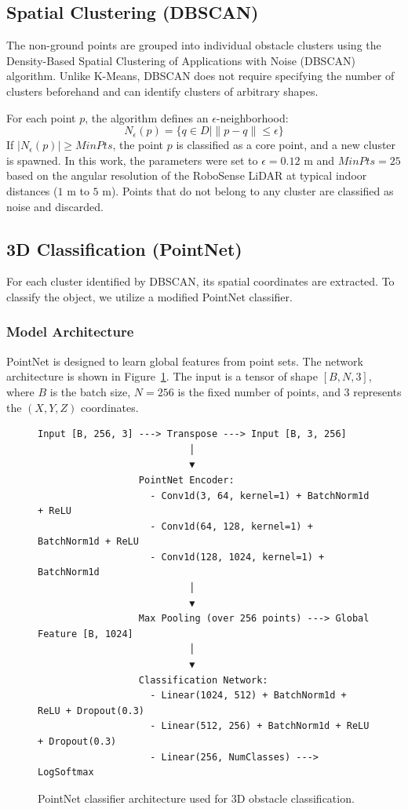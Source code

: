 \documentclass[a4paper,twocolumn]{article}
\begin{document}
\subsection{Spatial Clustering (DBSCAN)}
The non-ground points are grouped into individual obstacle clusters using the Density-Based Spatial Clustering of Applications with Noise (DBSCAN) algorithm. Unlike K-Means, DBSCAN does not require specifying the number of clusters beforehand and can identify clusters of arbitrary shapes.

For each point $p$, the algorithm defines an $\epsilon$-neighborhood:
\begin{equation}\label{eq:epsilon}
N_{\epsilon}(p) = \{q \in D \mid \|p - q\| \le \epsilon\}
\end{equation}
If $|N_{\epsilon}(p)| \ge MinPts$, the point $p$ is classified as a core point, and a new cluster is spawned. In this work, the parameters were set to $\epsilon = 0.12\text{ m}$ and $MinPts = 25$ based on the angular resolution of the RoboSense LiDAR at typical indoor distances ($1\text{ m}$ to $5\text{ m}$). Points that do not belong to any cluster are classified as noise and discarded.

\subsection{3D Classification (PointNet)}
For each cluster identified by DBSCAN, its spatial coordinates are extracted. To classify the object, we utilize a modified PointNet classifier.

\subsubsection{Model Architecture}
PointNet is designed to learn global features from point sets. The network architecture is shown in Figure~\ref{fig:pointnet}. The input is a tensor of shape $[B, N, 3]$, where $B$ is the batch size, $N = 256$ is the fixed number of points, and $3$ represents the $(X, Y, Z)$ coordinates.

\begin{figure}[!ht]
\centering
\begin{verbatim}
Input [B, 256, 3] ---> Transpose ---> Input [B, 3, 256]
                           │
                           ▼
                  PointNet Encoder:
                    - Conv1d(3, 64, kernel=1) + BatchNorm1d + ReLU
                    - Conv1d(64, 128, kernel=1) + BatchNorm1d + ReLU
                    - Conv1d(128, 1024, kernel=1) + BatchNorm1d
                           │
                           ▼
                  Max Pooling (over 256 points) ---> Global Feature [B, 1024]
                           │
                           ▼
                  Classification Network:
                    - Linear(1024, 512) + BatchNorm1d + ReLU + Dropout(0.3)
                    - Linear(512, 256) + BatchNorm1d + ReLU + Dropout(0.3)
                    - Linear(256, NumClasses) ---> LogSoftmax
\end{verbatim}
\caption{PointNet classifier architecture used for 3D obstacle classification.}\label{fig:pointnet}
\end{figure}
\end{document}
